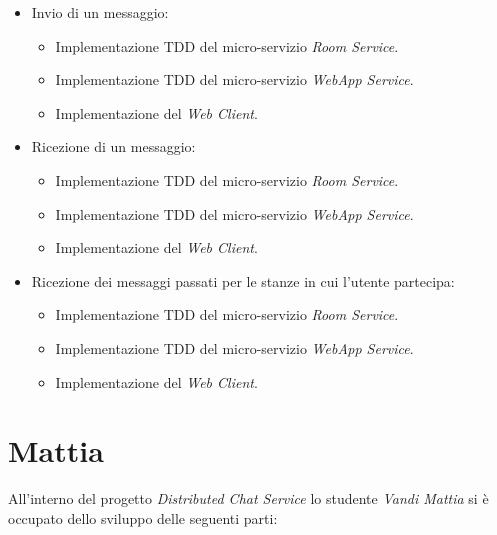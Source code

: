 \begin{itemize}
    \item Invio di un messaggio:
    \begin{itemize}
        \item Implementazione TDD del micro-servizio \textit{Room Service}.
        \item Implementazione TDD del micro-servizio \textit{WebApp Service}.
        \item Implementazione del \textit{Web Client}.
    \end{itemize}
    \item Ricezione di un messaggio:
    \begin{itemize}
        \item Implementazione TDD del micro-servizio \textit{Room Service}.
        \item Implementazione TDD del micro-servizio \textit{WebApp Service}.
        \item Implementazione del \textit{Web Client}.
    \end{itemize}
    \item Ricezione dei messaggi passati per le stanze in cui l'utente partecipa:
    \begin{itemize}
        \item Implementazione TDD del micro-servizio \textit{Room Service}.
        \item Implementazione TDD del micro-servizio \textit{WebApp Service}.
        \item Implementazione del \textit{Web Client}.
    \end{itemize}
\end{itemize}

\section{Mattia}

All'interno del progetto \textit{Distributed Chat Service} lo studente \textit{Vandi Mattia} si è occupato dello sviluppo delle seguenti parti:

